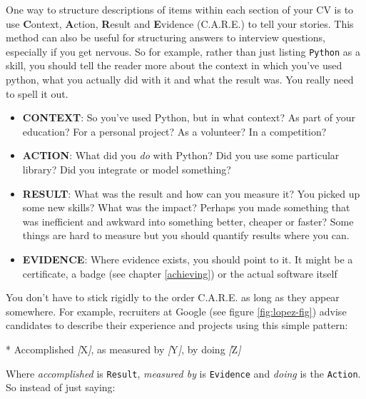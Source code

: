 \documentclass[
]{book}
\newenvironment{Shaded}{\begin{snugshade}}{\end{snugshade}}
\newcommand{\CommentTok}[1]{\textcolor[rgb]{0.56,0.35,0.01}{\textit{#1}}}
\newcommand{\NormalTok}[1]{#1}
\newcommand{\OtherTok}[1]{\textcolor[rgb]{0.56,0.35,0.01}{#1}}
\newcommand{\SpecialStringTok}[1]{\textcolor[rgb]{0.31,0.60,0.02}{#1}}
\providecommand{\tightlist}{%
  \setlength{\itemsep}{0pt}\setlength{\parskip}{0pt}}
\begin{document}
One way to structure descriptions of items within each section of your CV is to use \textbf{C}ontext, \textbf{A}ction, \textbf{R}esult and \textbf{E}vidence (C.A.R.E.) to tell your stories. This method can also be useful for structuring answers to interview questions, especially if you get nervous. So for example, rather than just listing \texttt{Python} as a skill, you should tell the reader more about the context in which you've used python, what you actually did with it and what the result was. You really need to spell it out.

\begin{itemize}
\tightlist
\item
  \textbf{CONTEXT}: So you've used Python, but in what context? As part of your education? For a personal project? As a volunteer? In a competition?
\item
  \textbf{ACTION}: What did you \emph{do} with Python? Did you use some particular library? Did you integrate or model something?
\item
  \textbf{RESULT}: What was the result and how can you measure it? You picked up some new skills? What was the impact? Perhaps you made something that was inefficient and awkward into something better, cheaper or faster? Some things are hard to measure but you should quantify results where you can.
\item
  \textbf{EVIDENCE}: Where evidence exists, you should point to it. It might be a certificate, a badge (see chapter \ref{achieving}) or the actual software itself
\end{itemize}

You don't have to stick rigidly to the order C.A.R.E. as long as they appear somewhere. For example, recruiters at Google (see figure \ref{fig:lopez-fig}) advise candidates to describe their experience and projects using this simple pattern:

\begin{Shaded}
\begin{Highlighting}[]
\SpecialStringTok{* }\NormalTok{Accomplished }\CommentTok{[}\OtherTok{X}\CommentTok{]}\NormalTok{, as measured by }\CommentTok{[}\OtherTok{Y}\CommentTok{]}\NormalTok{, by doing }\CommentTok{[}\OtherTok{Z}\CommentTok{]}
\end{Highlighting}
\end{Shaded}

Where \emph{accomplished} is \texttt{Result}, \emph{measured by} is \texttt{Evidence} and \emph{doing} is the \texttt{Action}. So instead of just saying:
\end{document}
